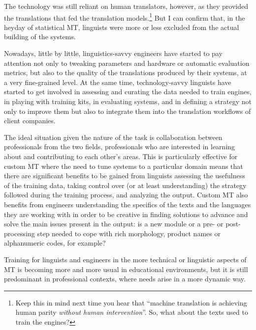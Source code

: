 \documentclass[output=paper]{langscibook}
\begin{document}
The technology was still reliant on human translators, however, as they provided the translations that fed the translation models.\footnote{Keep this in mind next time you hear that  “machine translation is achieving human parity \emph{without human intervention}”. So, what about the texts used to train the engines?} But I can confirm that, in the heyday of statistical MT, linguists were more or less excluded from the actual building of the systems. 

Nowadays, little by little, linguistics-savvy engineers have started to pay attention not only to tweaking parameters and hardware or automatic evaluation metrics, but also to the quality of the translations produced by their systems, at a very fine-grained level. At the same time, technology-savvy linguists have started to get involved in assessing and curating the data needed to train engines, in playing with training kits, in evaluating systems, and in defining a strategy not only to improve them but also to integrate them into the translation workflows of client companies. 

The ideal situation given the nature of the task is collaboration between professionals from the two fields, professionals who are interested in learning about and contributing to each other's areas. This is particularly effective for custom MT where the need to tune systems to a particular domain means that there are significant benefits to be gained from linguists assessing the usefulness of the training data, taking control over (or at least understanding) the strategy followed during the training process, and analyzing the output. Custom MT also benefits from engineers understanding the specifics of the texts and the languages they are working with in order to be creative in finding solutions to advance and solve the main issues present in the output: is a new module or a pre- or post-processing step needed to cope with rich morphology, product names or alphanumeric codes, for example? 

Training for linguists and engineers in the more technical or linguistic aspects of MT is becoming more and more usual in educational environments, but it is still predominant in professional contexts, where needs arise in a more dynamic way.
\end{document}
